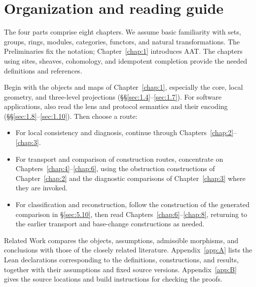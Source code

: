 \section*{Organization and reading guide}

The four parts comprise eight chapters. We assume basic familiarity with
sets, groups, rings, modules, categories, functors, and natural transformations.
The Preliminaries fix the notation; Chapter~\ref{chap:1} introduces AAT.
The chapters using sites, sheaves, cohomology, and idempotent completion
provide the needed definitions and references.

Begin with the objects and maps of Chapter~\ref{chap:1}, especially the core,
local geometry, and three-level projections (\S\S\ref{sec:1.4}--\ref{sec:1.7}).
For software applications, also read the lens and protocol semantics and
their encoding (\S\S\ref{sec:1.8}--\ref{sec:1.10}). Then choose a route:

\begin{itemize}
\item For local consistency and diagnosis, continue through
Chapters~\ref{chap:2}--\ref{chap:3}.
\item For transport and comparison of construction routes, concentrate on
Chapters~\ref{chap:4}--\ref{chap:6}, using the obstruction constructions of
Chapter~\ref{chap:2} and the diagnostic comparisons of Chapter~\ref{chap:3}
where they are invoked.
\item For classification and reconstruction, follow the construction of the
generated comparison in \S\ref{sec:5.10}, then read
Chapters~\ref{chap:6}--\ref{chap:8}, returning to the earlier transport and
base-change constructions as needed.
\end{itemize}

Related Work compares the objects, assumptions, admissible morphisms, and
conclusions with those of the closely related literature. Appendix~\ref{app:A}
lists the Lean declarations corresponding to the definitions, constructions,
and results, together with their assumptions and fixed source versions.
Appendix~\ref{app:B} gives the source locations and build instructions for
checking the proofs.
